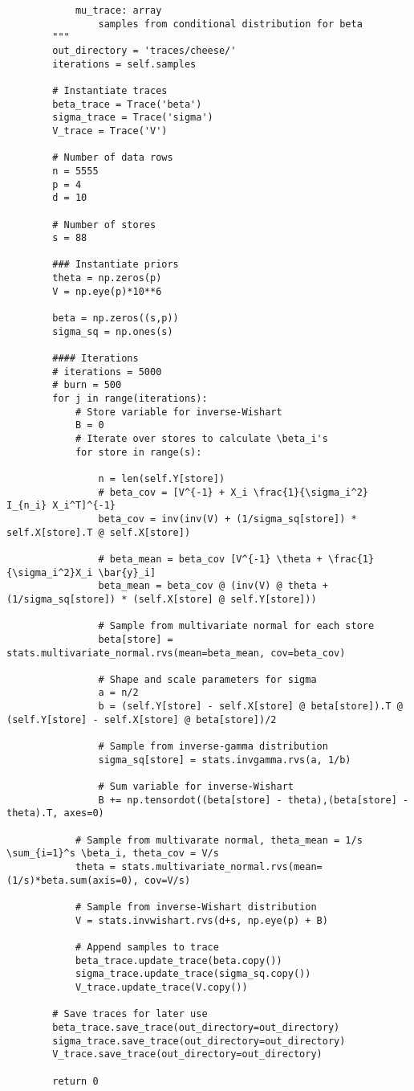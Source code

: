 \documentclass[11pt]{article}
\begin{document}
\begin{lstlisting}
            mu_trace: array
                samples from conditional distribution for beta
        """
        out_directory = 'traces/cheese/'
        iterations = self.samples

        # Instantiate traces
        beta_trace = Trace('beta')
        sigma_trace = Trace('sigma')
        V_trace = Trace('V')

        # Number of data rows
        n = 5555
        p = 4
        d = 10

        # Number of stores
        s = 88

        ### Instantiate priors
        theta = np.zeros(p)
        V = np.eye(p)*10**6

        beta = np.zeros((s,p))
        sigma_sq = np.ones(s)

        #### Iterations
        # iterations = 5000
        # burn = 500
        for j in range(iterations):
            # Store variable for inverse-Wishart
            B = 0
            # Iterate over stores to calculate \beta_i's
            for store in range(s):

                n = len(self.Y[store])
                # beta_cov = [V^{-1} + X_i \frac{1}{\sigma_i^2} I_{n_i} X_i^T]^{-1}
                beta_cov = inv(inv(V) + (1/sigma_sq[store]) * self.X[store].T @ self.X[store])

                # beta_mean = beta_cov [V^{-1} \theta + \frac{1}{\sigma_i^2}X_i \bar{y}_i]
                beta_mean = beta_cov @ (inv(V) @ theta + (1/sigma_sq[store]) * (self.X[store] @ self.Y[store]))

                # Sample from multivariate normal for each store
                beta[store] = stats.multivariate_normal.rvs(mean=beta_mean, cov=beta_cov)

                # Shape and scale parameters for sigma
                a = n/2
                b = (self.Y[store] - self.X[store] @ beta[store]).T @ (self.Y[store] - self.X[store] @ beta[store])/2

                # Sample from inverse-gamma distribution
                sigma_sq[store] = stats.invgamma.rvs(a, 1/b)
            
                # Sum variable for inverse-Wishart
                B += np.tensordot((beta[store] - theta),(beta[store] - theta).T, axes=0)

            # Sample from multivarate normal, theta_mean = 1/s \sum_{i=1}^s \beta_i, theta_cov = V/s
            theta = stats.multivariate_normal.rvs(mean=(1/s)*beta.sum(axis=0), cov=V/s)

            # Sample from inverse-Wishart distribution
            V = stats.invwishart.rvs(d+s, np.eye(p) + B)

            # Append samples to trace
            beta_trace.update_trace(beta.copy())
            sigma_trace.update_trace(sigma_sq.copy())
            V_trace.update_trace(V.copy())

        # Save traces for later use
        beta_trace.save_trace(out_directory=out_directory)
        sigma_trace.save_trace(out_directory=out_directory)
        V_trace.save_trace(out_directory=out_directory)

        return 0
    \end{lstlisting}
\end{document}
